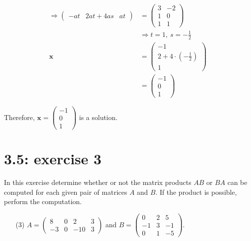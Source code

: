 \documentclass{report}
\begin{document}
\begin{enumerate}
\begin{align*}
\Rightarrow \begin{pmatrix} -at & 2at+4as & at \end{pmatrix} &= \begin{pmatrix} 3 & -2 \\ 1 & 0 \\ 1 & 1 \end{pmatrix} \\
& \Rightarrow t = 1, \ s = -\frac{1}{2} \\
\mathbf{x} &= \begin{pmatrix} -1 \\ 2+4 \cdot (-\frac{1}{2}) \\ 1 \end{pmatrix} \\
&= \begin{pmatrix} -1 \\ 0 \\ 1 \end{pmatrix}
\end{align*}



Therefore, $\mathbf{x} = \boxed{\begin{pmatrix} -1 \\ 0 \\ 1 \end{pmatrix}}$ is a solution.
\end{enumerate}




\section*{3.5: exercise 3} 
In this exercise determine whether or 
not the matrix products $AB$ or $BA$ can be computed for each given pair of 
matrices $A$ and $B$.  If the product is possible, perform the computation.
\begin{enumerate}
\item[(3)]
$A=\left(\begin{array}{rrrr} 8 & 0 & 2 & 3\\ -3 & 0 & -10 &
3\end{array}\right)$
and $B=\left(\begin{array}{rrr} 0 & 2 & 5\\ -1 & 3 & -1 \\ 0 & 1 &
-5\end{array}\right)$.

\end{enumerate}
\end{document}
